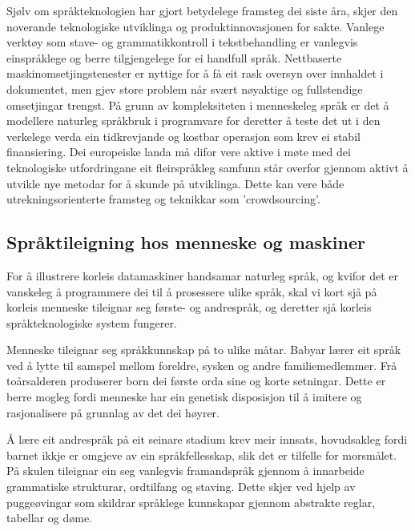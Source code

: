 \begin{multicols}{2}
Sjølv om språkteknologien har gjort betydelege framsteg dei siste åra, skjer den noverande teknologiske utviklinga og produktinnovasjonen for sakte. Vanlege verktøy som stave- og grammatikkontroll i tekstbehandling er vanlegvis einspråklege og berre tilgjengelege for ei handfull språk. Nettbaserte maskinomsetjingstenester er nyttige for å få eit rask oversyn over innhaldet i dokumentet, men gjev store problem når svært nøyaktige og fullstendige omsetjingar trengst. På grunn av kompleksiteten i menneskeleg språk er det å modellere naturleg språkbruk i programvare for deretter å teste det ut i den verkelege verda ein tidkrevjande og kostbar operasjon som krev ei stabil finansiering. Dei europeiske landa må difor vere aktive i møte med dei teknologiske utfordringane eit fleirspråkleg samfunn står overfor gjennom aktivt å utvikle nye metodar for å skunde på utviklinga. Dette kan vere både utrekningsorienterte framsteg og teknikkar som 'crowdsourcing'.


\subsection{Språktileigning hos menneske og maskiner}

For å illustrere korleis datamaskiner handsamar naturleg språk, og kvifor det er vanskeleg å programmere dei til å prosessere ulike språk, skal vi kort sjå på korleis menneske tileignar seg første- og andrespråk, og deretter sjå korleis språkteknologiske system fungerer.

Menneske tileignar seg språkkunnskap på to ulike måtar. Babyar lærer eit språk ved å lytte til samspel mellom foreldre, sysken og andre familiemedlemmer. Frå toårsalderen produserer born dei første orda sine og korte setningar. Dette er berre mogleg fordi menneske har ein genetisk disposisjon til å imitere og rasjonalisere på grunnlag av det dei høyrer.

Å lære eit andrespråk på eit seinare stadium krev meir innsats, hovudsakleg fordi barnet ikkje er omgjeve av ein språkfellesskap, slik det er tilfelle for morsmålet. På skulen tileignar ein seg vanlegvis framandspråk gjennom å innarbeide grammatiske strukturar, ordtilfang og staving. Dette skjer ved hjelp av puggeøvingar som skildrar språklege kunnskapar gjennom abstrakte reglar, tabellar og døme.



\end{multicols}
